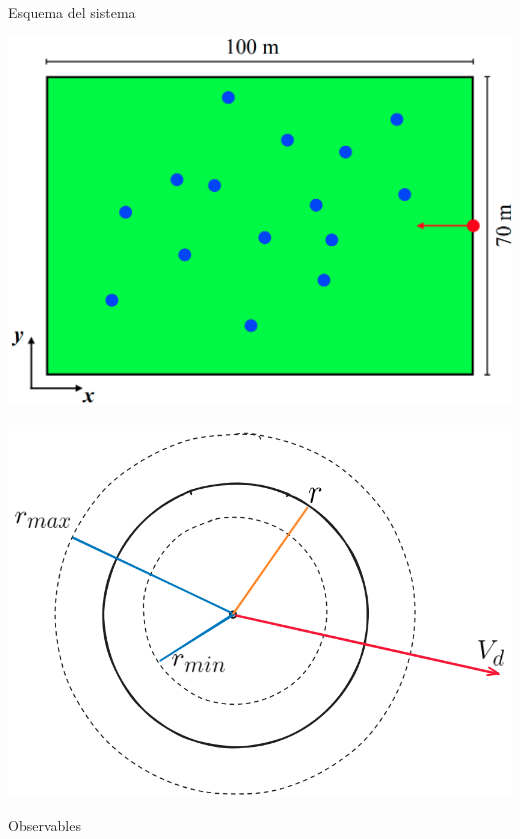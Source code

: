 \begin{frame}{Esquema del sistema}
    \begin{center}
    \begin{minipage}{0.65\textwidth}
        \includegraphics[width=\textwidth]{pic/04-simulaciones/esquema-field}
    \end{minipage}
    \hfill
    \begin{minipage}{0.3\textwidth}
        \includegraphics[width=\textwidth]{pic/04-simulaciones/esquema-particula}
    \end{minipage}
\end{center}
\end{frame}

\begin{frame}{Observables}

\end{frame}